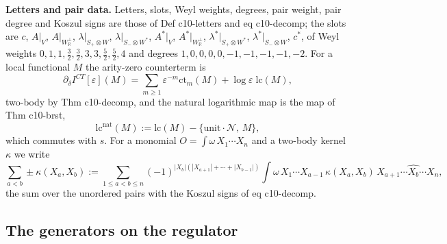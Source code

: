 \documentclass[11pt]{article}
\numberwithin{equation}{section}
\theoremstyle{plain}
\theoremstyle{definition}
\newcommand{\Ap}{A|_{W_{\mathbb R}^\perp}}
\newcommand{\AV}{A|_V}
\newcommand{\lc}{\mathrm{lc}}
\newcommand{\lcn}{\mathrm{lc}^{\mathrm{nat}}}
\newcommand{\ct}{\mathrm{ct}}
\newcommand{\Fc}{\mathcal N}
\begin{document}
\textbf{Letters and pair data.} Letters, slots, Weyl weights, degrees, pair weight, pair degree and Koszul signs are those of Def c10-letters and eq c10-decomp; the slots are $c$, $\AV$, $\Ap$, $\lambda|_{S_+\otimes W}$, $\lambda|_{S_-\otimes W^*}$, $A^*|_V$, $A^*|_{W_{\mathbb R}^\perp}$, $\lambda^*|_{S_+\otimes W^*}$, $\lambda^*|_{S_-\otimes W}$, $c^*$, of Weyl weights $0,1,1,\tfrac32,\tfrac32,3,3,\tfrac52,\tfrac52,4$ and degrees $1,0,0,0,0,-1,-1,-1,-1,-2$. For a local functional $M$ the arity-zero counterterm is
\[
\partial_\delta I^{CT}[\varepsilon](M)=\sum_{m\ge1}\varepsilon^{-m}\ct_m(M)+\log\varepsilon\;\lc(M),
\]
two-body by Thm c10-decomp, and the natural logarithmic map is the map of Thm c10-brst,
\begin{equation}
\lcn(M):=\lc(M)-\{\text{unit}\cdot\Fc,\,M\},
\label{eq:op-lcn}
\end{equation}
which commutes with $s$. For a monomial $O=\int\omega\,X_1\cdots X_n$ and a two-body kernel $\kappa$ we write
\begin{equation}
\sum_{a<b}\pm\kappa(X_a,X_b):=\sum_{1\le a<b\le n}(-1)^{|X_b|(|X_{a+1}|+\cdots+|X_{b-1}|)}\int\omega\,X_1\cdots X_{a-1}\,\kappa(X_a,X_b)\,X_{a+1}\cdots\widehat{X_b}\cdots X_n ,
\label{eq:op-pairsum}
\end{equation}
the sum over the unordered pairs with the Koszul signs of eq c10-decomp.

\subsection{The generators on the regulator}
\end{document}
